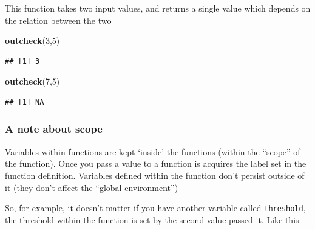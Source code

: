 \documentclass[]{book}
\newenvironment{Shaded}{\begin{snugshade}}{\end{snugshade}}
\newcommand{\KeywordTok}[1]{\textcolor[rgb]{0.13,0.29,0.53}{\textbf{#1}}}
\newcommand{\DecValTok}[1]{\textcolor[rgb]{0.00,0.00,0.81}{#1}}
\newcommand{\NormalTok}[1]{#1}
\begin{document}
This function takes two input values, and returns a single value which
depends on the relation between the two

\begin{Shaded}
\begin{Highlighting}[]
\KeywordTok{outcheck}\NormalTok{(}\DecValTok{3}\NormalTok{,}\DecValTok{5}\NormalTok{)}
\end{Highlighting}
\end{Shaded}

\begin{verbatim}
## [1] 3
\end{verbatim}

\begin{Shaded}
\begin{Highlighting}[]
\KeywordTok{outcheck}\NormalTok{(}\DecValTok{7}\NormalTok{,}\DecValTok{5}\NormalTok{)}
\end{Highlighting}
\end{Shaded}

\begin{verbatim}
## [1] NA
\end{verbatim}

\subsubsection{A note about scope}\label{a-note-about-scope}

Variables within functions are kept `inside' the functions (within the
``scope'' of the function). Once you pass a value to a function is
acquires the label set in the function definition. Variables defined
within the function don't persist outside of it (they don't affect the
``global environment'')

So, for example, it doesn't matter if you have another variable called
\texttt{threshold}, the threshold within the function is set by the
second value passed it. Like this:
\end{document}

